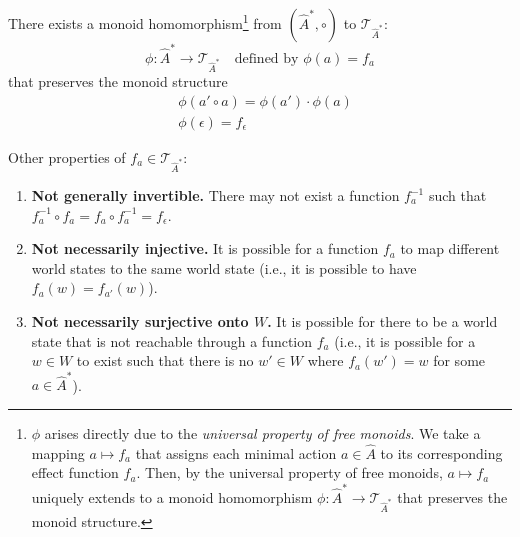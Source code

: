There exists a monoid homomorphism\footnote{
$\phi$ arises directly due to the \emph{universal property of free monoids}.
We take a mapping $a \mapsto f_{a}$ that assigns each minimal action $a \in \hat{A}$ to its corresponding effect function $f_{a}$.
Then, by the universal property of free monoids, $a \mapsto f_{a}$ uniquely extends to a monoid homomorphism $\phi : \hat{A}^{\ast} \to \mathcal{T}_{\hat{A}^{\ast}}$ that preserves the monoid structure.
} from $(\hat{A}^{\ast}, \circ)$ to $\mathcal{T}_{\hat{A}^{\ast}}$:
\begin{equation}
    \phi : \hat{A}^{\ast} \to \mathcal{T}_{\hat{A}^{\ast}} \quad\text{defined by $\phi(a) = f_{a}$}
\end{equation}
that preserves the monoid structure
\begin{align}
    &\phi(a' \circ a) = \phi(a') \cdot \phi(a) \\
    &\phi(\epsilon) = f_{\epsilon}
\end{align}

Other properties of $f_{a} \in \mathcal{T}_{\hat{A}^{\ast}}$:
\begin{enumerate}[(1)]
    \item \textbf{Not generally invertible.}
    There may not exist a function $f_{a}^{-1}$ such that $f_{a}^{-1} \circ f_{a} = f_{a} \circ f_{a}^{-1} = f_{\epsilon}$.
    \item \textbf{Not necessarily injective.}
    It is possible for a function $f_{a}$ to map different world states to the same world state (i.e., it is possible to have $f_{a}(w) = f_{a'}(w)$).
    \item \textbf{Not necessarily surjective onto $W$.}
    It is possible for there to be a world state that is not reachable through a function $f_{a}$ (i.e., it is possible for a $w \in W$ to exist such that there is no $w' \in W$ where $f_{a}(w') = w$ for some $a \in \hat{A}^{\ast}$).
\end{enumerate}

